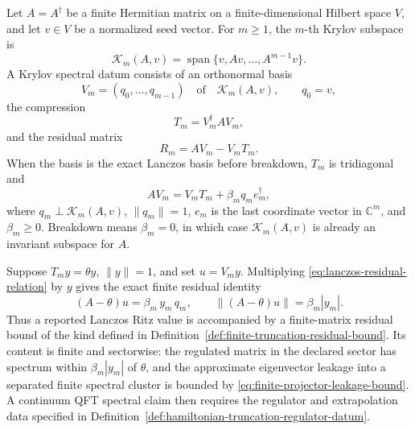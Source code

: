 \begin{definition}
\label{def:krylov-spectral-data}
Let \(A=A^\dagger\) be a finite Hermitian matrix on a finite-dimensional
Hilbert space \(V\), and let \(v\in V\) be a normalized seed vector.  For
\(m\geq1\), the \(m\)-th Krylov subspace is
\[
  \mathcal K_m(A,v)
  =
  \operatorname{span}\{v,Av,\ldots,A^{m-1}v\}.
\]
A Krylov spectral datum consists of an orthonormal basis
\[
  V_m=(q_0,\ldots,q_{m-1})
  \quad\text{of}\quad
  \mathcal K_m(A,v),
  \qquad q_0=v,
\]
the compression
\[
  T_m=V_m^\dagger A V_m ,
\]
and the residual matrix
\[
  R_m=A V_m-V_mT_m .
\]
When the basis is the exact Lanczos basis before breakdown, \(T_m\) is
tridiagonal and
\begin{equation}
  A V_m=V_mT_m+\beta_m q_m e_m^\dagger ,
  \label{eq:lanczos-residual-relation}
\end{equation}
where \(q_m\perp\mathcal K_m(A,v)\), \(\|q_m\|=1\), \(e_m\) is the last
coordinate vector in \(\mathbb C^m\), and \(\beta_m\geq0\).  Breakdown
means \(\beta_m=0\), in which case \(\mathcal K_m(A,v)\) is already an
invariant subspace for \(A\).
\end{definition}

Suppose \(T_m y=\theta y\), \(\|y\|=1\), and set \(u=V_m y\).  Multiplying
\eqref{eq:lanczos-residual-relation} by \(y\) gives the exact finite
residual identity
\begin{equation}
  (A-\theta)u=\beta_m\, y_m\, q_m,
  \qquad
  \|(A-\theta)u\|=\beta_m |y_m| .
  \label{eq:lanczos-ritz-residual-bound}
\end{equation}
Thus a reported Lanczos Ritz value is accompanied by a finite-matrix
residual bound of the kind defined in
Definition~\ref{def:finite-truncation-residual-bound}.  Its content is
finite and sectorwise: the regulated matrix in the declared sector has
spectrum within \(\beta_m|y_m|\) of \(\theta\), and the approximate
eigenvector leakage into a separated finite spectral cluster is bounded by
\eqref{eq:finite-projector-leakage-bound}.  A continuum QFT spectral claim
then requires the regulator and extrapolation data specified in
Definition~\ref{def:hamiltonian-truncation-regulator-datum}.

